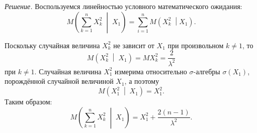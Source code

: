 \textit{Решение.} Воспользуемся линейностью условного математического ожидания:
$$M \left( \sum \limits_{k = 1}^n X_k^2 \; \middle| \; X_1 \right) =
  \sum \limits_{i = 1}^n M \left( X_k^2 \; \middle| X_1 \right).$$

Поскольку случайная величина $X_k^2$ не зависит от $X_1$ при произвольном $k \neq 1$, то
$$M \left( X_k^2 \; \middle| \; X_1 \right) =
  MX_k^2 =
  \frac{2}{ \lambda^2}$$
при $k \neq 1$.
Случайная величина $X_1^2$ измерима относительно $ \sigma $-алгебры $ \sigma \left( X_1 \right) $,
порождённой случайной величиной $X_1$,
а поэтому
$$M \left( X_1^2 \; \middle| \; X_1 \right) =
  X_1^2.$$
Таким образом:
$$M \left( \sum \limits_{k = 1}^n X_k^2 \; \middle| \; X_1 \right) =
  X_1^2 + \frac{2 \left( n - 1 \right) }{ \lambda^2}.$$

